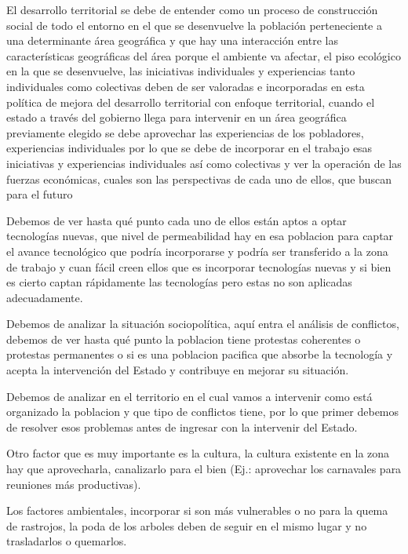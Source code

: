 \documentclass[
  letterpaper,
  DIV=11,
  numbers=noendperiod]{scrartcl}
\begin{document}
El desarrollo territorial se debe de entender como un proceso de
construcción social de todo el entorno en el que se desenvuelve la
población perteneciente a una determinante área geográfica y que hay una
interacción entre las características geográficas del área porque el
ambiente va afectar, el piso ecológico en la que se desenvuelve, las
iniciativas individuales y experiencias tanto individuales como
colectivas deben de ser valoradas e incorporadas en esta política de
mejora del desarrollo territorial con enfoque territorial, cuando el
estado a través del gobierno llega para intervenir en un área geográfica
previamente elegido se debe aprovechar las experiencias de los
pobladores, experiencias individuales por lo que se debe de incorporar
en el trabajo esas iniciativas y experiencias individuales así como
colectivas y ver la operación de las fuerzas económicas, cuales son las
perspectivas de cada uno de ellos, que buscan para el futuro

Debemos de ver hasta qué punto cada uno de ellos están aptos a optar
tecnologías nuevas, que nivel de permeabilidad hay en esa poblacion para
captar el avance tecnológico que podría incorporarse y podría ser
transferido a la zona de trabajo y cuan fácil creen ellos que es
incorporar tecnologías nuevas y si bien es cierto captan rápidamente las
tecnologías pero estas no son aplicadas adecuadamente.

Debemos de analizar la situación sociopolítica, aquí entra el análisis
de conflictos, debemos de ver hasta qué punto la poblacion tiene
protestas coherentes o protestas permanentes o si es una poblacion
pacifica que absorbe la tecnología y acepta la intervención del Estado y
contribuye en mejorar su situación.

Debemos de analizar en el territorio en el cual vamos a intervenir como
está organizado la poblacion y que tipo de conflictos tiene, por lo que
primer debemos de resolver esos problemas antes de ingresar con la
intervenir del Estado.

Otro factor que es muy importante es la cultura, la cultura existente en
la zona hay que aprovecharla, canalizarlo para el bien (Ej.: aprovechar
los carnavales para reuniones más productivas).

Los factores ambientales, incorporar si son más vulnerables o no para la
quema de rastrojos, la poda de los arboles deben de seguir en el mismo
lugar y no trasladarlos o quemarlos.
\end{document}
